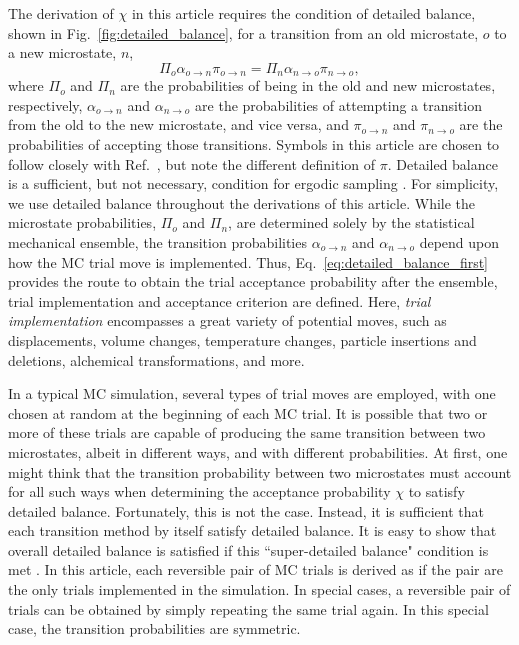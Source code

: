 \documentclass[
  9pt,
  bestpractices,
  pubversion,
]{livecoms}
\begin{document}
The derivation of $\chi$ in this article requires the condition of detailed balance, shown in Fig.~\ref{fig:detailed_balance}, for a transition from an old microstate, $o$ to a new microstate, $n$,
\begin{equation}
\Pi_o\alpha_{o\rightarrow n}\pi_{o\rightarrow n} = \Pi_n\alpha_{n\rightarrow o}\pi_{n\rightarrow o},
\label{eq:detailed_balance_first}
\end{equation}
where $\Pi_o$ and $\Pi_n$ are the probabilities of being in the old and new microstates, respectively, $\alpha_{o\rightarrow n}$ and $\alpha_{n\rightarrow o}$ are the probabilities of attempting a transition from the old to the new microstate, and vice versa, and $\pi_{o\rightarrow n}$ and $\pi_{n\rightarrow o}$ are the probabilities of accepting those transitions.
Symbols in this article are chosen to follow closely with Ref.~\cite{frenkel_understanding_2002}, but note the different definition of $\pi$.
Detailed balance is a sufficient, but not necessary, condition for ergodic sampling \cite{manousiouthakis_strict_1999}.
For simplicity, we use detailed balance throughout the derivations of this article.
While the microstate probabilities, $\Pi_o$ and $\Pi_n$, are determined solely by the statistical mechanical ensemble, the transition probabilities $\alpha_{o\rightarrow n}$ and $\alpha_{n\rightarrow o}$ depend upon how the MC trial move is implemented.
Thus, Eq.~\ref{eq:detailed_balance_first} provides the route to obtain the trial acceptance probability after the ensemble, trial implementation and acceptance criterion are defined.
Here, \emph{trial implementation} encompasses a great variety of potential moves, such as displacements, volume changes, temperature changes, particle insertions and deletions, alchemical transformations, and more.

In a typical MC simulation, several types of trial moves are employed, with one chosen at random at the beginning of each MC trial.
It is possible that two or more of these trials are capable of producing the same transition between two microstates, albeit in different ways, and with different probabilities.
At first, one might think that the transition probability between two microstates must account for all such ways when determining the acceptance probability $\chi$ to satisfy detailed balance.
Fortunately, this is not the case.
Instead, it is sufficient that each transition method by itself satisfy detailed balance.
It is easy to show that overall detailed balance is satisfied if this ``super-detailed balance" condition is met \cite{frenkel_speed-up_2004}.
In this article, each reversible pair of MC trials is derived as if the pair are the only trials implemented in the simulation.
In special cases, a reversible pair of trials can be obtained by simply repeating the same trial again.
In this special case, the transition probabilities are symmetric.
\end{document}
